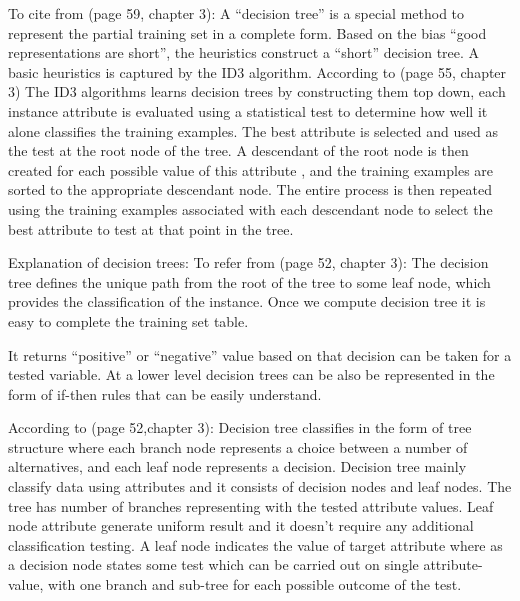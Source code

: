 \documentclass{report}
\begin{document}
To cite from \cite{Mitchell1997MachineLearning}(page 59, chapter 3): A ``decision tree'' is a special method to represent the partial training set in a complete form. Based on the bias ``good representations are short'', the heuristics construct a ``short'' decision tree. A basic heuristics is captured by the ID3 algorithm. According to \cite{Mitchell1997MachineLearning}(page 55, chapter 3) The ID3 algorithms learns decision trees by constructing them top down, each instance attribute is evaluated using a statistical test to determine how well it alone classifies the training examples. The best attribute is selected and used as the test at the root node of the tree. A descendant of the root node is then created for each possible value of this attribute , and the training examples are sorted to the appropriate descendant node. The entire process is then repeated using the training examples associated with each descendant node to select the best attribute to test at that point in the tree. 

Explanation of decision trees: To refer from \cite{Mitchell1997MachineLearning}(page 52, chapter 3): The decision tree defines the unique path from the root of the tree to some leaf node, which provides the classification of the instance. Once we compute decision tree it is easy to complete the training set table. 

It returns ``positive'' or ``negative'' value based on that decision can be taken for a tested variable. At a lower level decision trees can be also be represented in the form of if-then rules that can be easily understand.


According to \cite{Mitchell1997MachineLearning}(page 52,chapter 3): Decision tree classifies in the form of tree structure where each branch node represents a choice between a number of alternatives, and each leaf node represents a decision. Decision tree mainly classify data using attributes and it consists of decision nodes and leaf nodes. The tree has number of branches representing with the tested attribute values. Leaf node attribute generate uniform result and it doesn't require any additional classification testing. A leaf node indicates the value of target attribute where as a decision node states some test which can be carried out on single attribute-value, with one branch and sub-tree for each possible outcome of the test.
\end{document}

